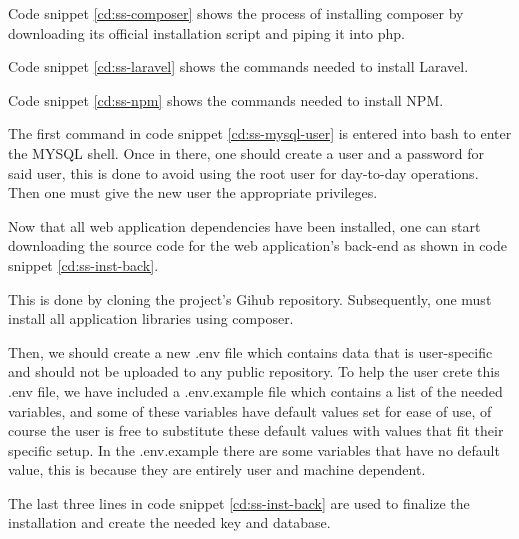 \newpage

Code snippet \ref{cd:ss-composer} shows the process of installing composer by downloading its official installation script and piping it into php.


Code snippet \ref{cd:ss-laravel} shows the commands needed to install Laravel.


Code snippet \ref{cd:ss-npm} shows the commands needed to install NPM.


The first command in code snippet \ref{cd:ss-mysql-user} is entered into bash to enter the MYSQL shell. Once in there, one should create a user and a password for said user, this is done to avoid using the root user for day-to-day operations. Then one must give the new user the appropriate privileges.


Now that all web application dependencies have been installed, one can start downloading the source code for the web application's back-end as shown in code snippet \ref{cd:ss-inst-back}. 


\newpage

This is done by cloning the project's Gihub repository. Subsequently, one must install all application libraries using composer.

Then, we should create a new .env file which contains data that is user-specific and should not be uploaded to any public repository. To help the user crete this .env file, we have included a .env.example file which contains a list of the needed variables, and some of these variables have default values set for ease of use, of course the user is free to substitute these default values with values that fit their specific setup. In the .env.example there are some variables that have no default value, this is because they are entirely user and machine dependent.

The last three lines in code snippet \ref{cd:ss-inst-back} are used to finalize the installation and create the needed key and database.


